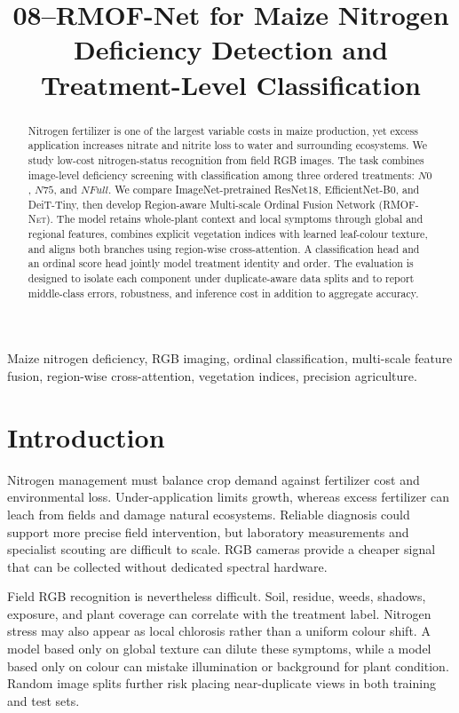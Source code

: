 \documentclass[conference]{IEEEtran}
\title{08--RMOF-Net for Maize Nitrogen Deficiency Detection and Treatment-Level Classification}
\author{\IEEEauthorblockN{Xicheng Peng, Tao Zhong, Houjun Liu, Zixuan Shao, and He Zhu}
\IEEEauthorblockA{z5526784, z5643577, z5461152, z5663409, z5696771}}
\newcommand{\rmofnet}{\textsc{RMOF-Net}\xspace}
\begin{document}
\maketitle

\begin{abstract}
Nitrogen fertilizer is one of the largest variable costs in maize production, yet excess application increases nitrate and nitrite loss to water and surrounding ecosystems. We study low-cost nitrogen-status recognition from field RGB images. The task combines image-level deficiency screening with classification among three ordered treatments: $N0$, $N75$, and $NFull$. We compare ImageNet-pretrained ResNet18, EfficientNet-B0, and DeiT-Tiny, then develop Region-aware Multi-scale Ordinal Fusion Network (\rmofnet). The model retains whole-plant context and local symptoms through global and regional features, combines explicit vegetation indices with learned leaf-colour texture, and aligns both branches using region-wise cross-attention. A classification head and an ordinal score head jointly model treatment identity and order. The evaluation is designed to isolate each component under duplicate-aware data splits and to report middle-class errors, robustness, and inference cost in addition to aggregate accuracy.
\end{abstract}

\begin{IEEEkeywords}
Maize nitrogen deficiency, RGB imaging, ordinal classification, multi-scale feature fusion, region-wise cross-attention, vegetation indices, precision agriculture.
\end{IEEEkeywords}

\section{Introduction}
Nitrogen management must balance crop demand against fertilizer cost and environmental loss. Under-application limits growth, whereas excess fertilizer can leach from fields and damage natural ecosystems. Reliable diagnosis could support more precise field intervention, but laboratory measurements and specialist scouting are difficult to scale. RGB cameras provide a cheaper signal that can be collected without dedicated spectral hardware.

Field RGB recognition is nevertheless difficult. Soil, residue, weeds, shadows, exposure, and plant coverage can correlate with the treatment label. Nitrogen stress may also appear as local chlorosis rather than a uniform colour shift. A model based only on global texture can dilute these symptoms, while a model based only on colour can mistake illumination or background for plant condition. Random image splits further risk placing near-duplicate views in both training and test sets.
\end{document}
